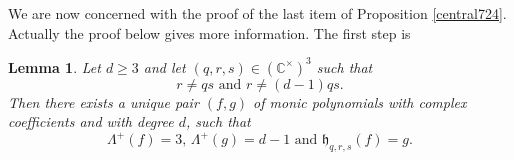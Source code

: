 \documentclass[10pt]{article}
\newtheorem{lemma}[theorem]{Lemma}
\theoremstyle{definition}
\numberwithin{equation}{section}
\newcommand {\C}{{\mathbb{C}}}
\begin{document}
We are now concerned with the proof of the last item of Proposition \ref{central724}. Actually the proof below gives more information. The first step is

\begin{lemma} \label{Lemma:FirstStep}
Let $d \geqslant 3$ and let $(q,r,s)\in(\C^\times)^3$ such that
\begin{equation}\label{rneqneq}
r\neq qs \text{ and } r\neq (d-1) qs.
\end{equation}
Then there exists a unique pair $(f,g)$ of monic polynomials with complex coefficients and with degree $d$, such that
\begin{equation}\label{cond1323}
\Lambda^+ (f)=3,\, \Lambda^+ (g) =d-1 \text { and } 
\mathfrak h_{q,r,s} (f) = g.
\end{equation}
\end{lemma}
\end{document}
